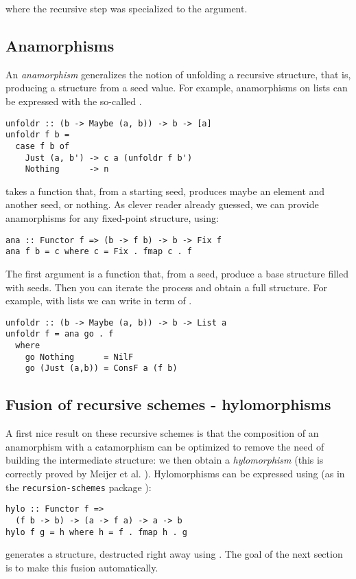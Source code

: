 \noindent
where the recursive step was specialized to the  argument.

\subsection{Anamorphisms}
An \emph{anamorphism} generalizes the notion of unfolding a recursive structure, that is, producing a structure from a seed value.
For example, anamorphisms on lists can be expressed with the so-called .
\begin{verbatim}
unfoldr :: (b -> Maybe (a, b)) -> b -> [a]
unfoldr f b =
  case f b of
    Just (a, b') -> c a (unfoldr f b')
    Nothing      -> n
\end{verbatim}

\noindent {} takes a function that, from a starting seed, produces maybe an element and another seed, or nothing. As clever reader already guessed, we can provide anamorphisms for any fixed-point structure, using:
\begin{verbatim}
ana :: Functor f => (b -> f b) -> b -> Fix f
ana f b = c where c = Fix . fmap c . f
\end{verbatim}
The first argument is a function that, from a seed, produce a base structure filled with seeds. Then you can iterate the process and obtain a full structure. For example, with lists we can write  in term of .
\begin{verbatim}
unfoldr :: (b -> Maybe (a, b)) -> b -> List a
unfoldr f = ana go . f
  where
    go Nothing      = NilF
    go (Just (a,b)) = ConsF a (f b)
\end{verbatim}

\subsection{Fusion of recursive schemes - hylomorphisms}
A first nice result on these recursive schemes is that the composition of an anamorphism with a catamorphism can be optimized to remove the need of building the intermediate structure: we then obtain a \emph{hylomorphism} (this is correctly proved by Meijer et al. \cite{4cec4a43c86444479dc0003182424795}).
Hylomorphisms can be expressed using  (as in the \verb|recursion-schemes| package \cite{ekmett:eschems}):
\begin{verbatim}
hylo :: Functor f =>
  (f b -> b) -> (a -> f a) -> a -> b
hylo f g = h where h = f . fmap h . g
\end{verbatim}
\noindent {} generates a structure, destructed right away using .
The goal of the next section is to make this fusion automatically.